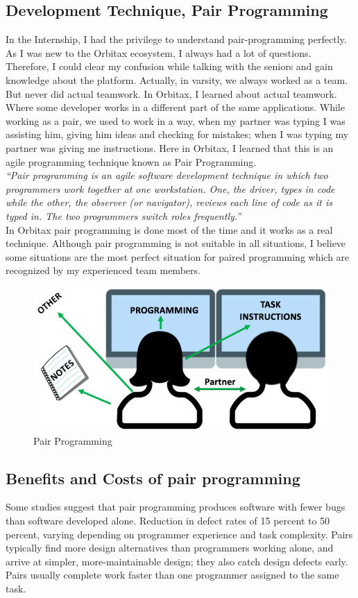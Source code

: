 \begin{flushleft}
\section{Development Technique, Pair Programming}
In the Internship, I had the privilege to understand pair-programming perfectly. As I was new to the Orbitax ecosystem, I always had a lot of questions. Therefore, I could clear my confusion while talking with the seniors and gain knowledge about the platform.
Actually, in varsity, we always worked as a team. But never did actual teamwork. In Orbitax, I learned about actual teamwork. Where some developer works in a different part of the same applications.
While working as a pair, we used to work in a way, when my partner was typing I was assisting him, giving him ideas and checking for mistakes; when I was typing my partner was giving me instructions.
Here in Orbitax, I learned that this is an agile programming technique known as Pair Programming. \\
\textit{“Pair programming is an agile software development technique in which two programmers work together at one workstation. One, the driver, types in code while the other, the observer (or navigator), reviews each line of code as it is typed in. The two programmers switch roles frequently.”} \\ 
In Orbitax pair programming is done most of the time and it works as a real technique. Although pair programming is not suitable in all situations, I believe some situations are the most perfect situation for paired programming which are recognized by my experienced team members.

 \begin{figure}[htbp]
\centerline{\includegraphics[scale=0.3]{Figures/p.png}}
\caption{Pair Programming}
\label{fig}
\end{figure}

\subsection{Benefits and Costs of pair programming}
Some studies suggest that pair programming produces software with fewer bugs than software developed alone. Reduction in defect rates of 15 percent to 50 percent, varying depending on programmer experience and task complexity. Pairs typically find more design alternatives than programmers working alone, and arrive at simpler, more-maintainable design; they also catch design defects early. Pairs usually complete work faster than one programmer assigned to the same task. \\ 


\end{flushleft}
